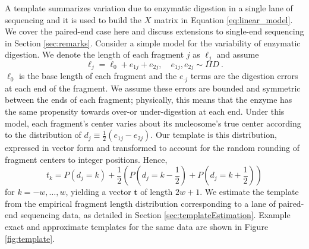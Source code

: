 A template summarizes variation due to enzymatic digestion in a single lane of sequencing and it is used to build the $X$ matrix in Equation \ref{eq:linear_model}.
We cover the paired-end case here and discuss extensions to single-end sequencing in Section \ref{sec:remarks}.
%
%
%
%
Consider a simple model for the variability of enzymatic digestion.
We denote the length of each fragment $j$ as $\ell_j$ and assume
\begin{equation}
\ell_j = \ell_0 + e_{1j} + e_{2j}, \quad e_{1j}, e_{2j} \sim IID \ .
\end{equation}
$\ell_0$ is the base length of each fragment and the $e_{\cdot j}$ terms are the digestion errors at each end of the fragment.
We assume these errors are bounded and symmetric between the ends of each fragment; physically, this means that the enzyme has the same propensity towards over-or under-digestion at each end.
Under this model, each fragment's center varies about its nucleosome's true center according to the distribution of $d_j \equiv \frac{1}{2} (e_{1j} - e_{2j})$.
Our template is this distribution, expressed in vector form and transformed to account for the random rounding of fragment centers to integer positions.
Hence, 
\begin{equation}
t_k = P(d_j = k) + \frac{1}{2}\left( P(d_j = k - \frac{1}{2}) + P(d_j = k + \frac{1}{2}) \right)
\end{equation}
for $k = -w, \dots, w$, yielding a vector $\bm t$ of length $2w + 1$.
We estimate the template from the empirical fragment length distribution corresponding to a lane of paired-end sequencing data, as detailed in Section \ref{sec:templateEstimation}. 
%
%
%
Example exact and approximate templates for the same data are shown in Figure \ref{fig:template}.

